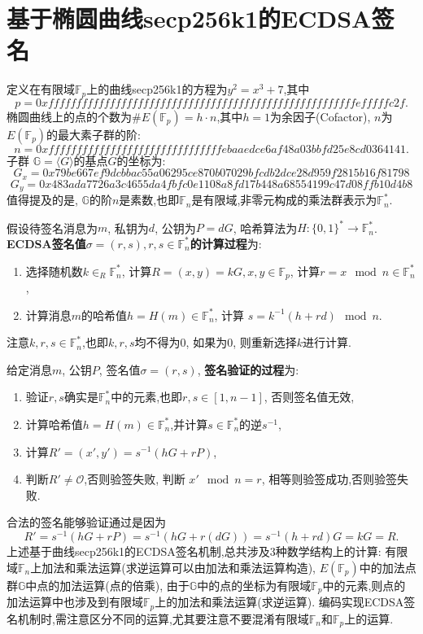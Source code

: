 \documentclass{article}
\renewcommand{\G}{\mathbb{G}}
\newcommand{\F}{\mathbb{F}}
\begin{document}
\section{基于椭圆曲线secp256k1的ECDSA签名}

定义在有限域$\F_p$上的曲线secp256k1的方程为$y^2 = x^3 + 7$,其中
\footnotesize
$$p = 0xfffffffffffffffffffffffffffffffffffffffffffffffffffffffefffffc2f.$$
\normalsize
椭圆曲线上的点的个数为$\#E(\F_p) = h \cdot n$,其中$h = 1$为余因子(Cofactor), $n$为$E(\F_p)$的最大素子群的阶:
\footnotesize
$$ n = 0xfffffffffffffffffffffffffffffffebaaedce6af48a03bbfd25e8cd0364141.$$
\normalsize
子群 $\G = \langle G \rangle$的基点$G$的坐标为:
\footnotesize
$$G_x = 0x79be667ef9dcbbac55a06295ce870b07029bfcdb2dce28d959f2815b16f81798$$
$$G_y = 0x483ada7726a3c4655da4fbfc0e1108a8fd17b448a68554199c47d08ffb10d4b8$$
\normalsize
值得提及的是, $\G$的阶$n$是素数,也即$\F_n$是有限域,非零元构成的乘法群表示为$\F_n^*$.

假设待签名消息为$m$, 私钥为$d$, 公钥为$P=dG$, 哈希算法为$H: \{0,1\}^*\rightarrow\F_n^*$.
\textbf{ECDSA签名值$\sigma = (r,s), r, s \in \F_n^*$的计算过程}为: 
\begin{enumerate}
\item 选择随机数$k\in_R\F_n^*$, 计算$R = (x,y) = kG, x, y \in \F_p$, 计算$r = x\mod n \in \F_n^*$,
\item 计算消息$m$的哈希值$h=H(m)\in\F_n^*$, 计算 $s = k^{-1} (h + rd) \mod n$. 
\end{enumerate}
注意$k, r, s \in \F_n^*$,也即$k, r, s$均不得为0, 如果为0, 则重新选择$k$进行计算.

给定消息$m$, 公钥$P$, 签名值$\sigma = (r, s)$, \textbf{签名验证的过程}为:
\begin{enumerate}
\item  验证$r, s$确实是$\F_n^*$中的元素,也即$r, s \in [1, n-1]$, 否则签名值无效,
\item 计算哈希值$h=H(m)\in\F_n^*$,并计算$s\in\F_n^*$的逆$s^{-1}$,
\item  计算$R' = (x', y') = s^{-1}(hG + rP)$, 
\item 判断$R' \neq \mathcal{O}$,否则验签失败, 判断 $x' \mod n = r$, 相等则验签成功,否则验签失败.
\end{enumerate}
合法的签名能够验证通过是因为
$$R' = s^{-1}(hG + rP) = s^{-1}(hG + r(dG)) = s^{-1}(h+rd)G = kG = R.$$
上述基于曲线secp256k1的ECDSA签名机制,总共涉及3种数学结构上的计算:
有限域$\F_n$上加法和乘法运算(求逆运算可以由加法和乘法运算构造), $E(\F_p)$中的加法点群$\G$中点的加法运算(点的倍乘),
由于$\G$中的点的坐标为有限域$\F_p$中的元素,则点的加法运算中也涉及到有限域$\F_p$上的加法和乘法运算(求逆运算).
编码实现ECDSA签名机制时,需注意区分不同的运算,尤其要注意不要混淆有限域$\F_n$和$\F_p$上的运算.
\end{document}
